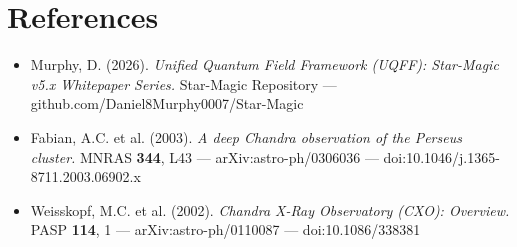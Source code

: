 \documentclass[12pt,a4paper]{article}
\begin{document}
\section*{References}
\begin{itemize}
  \item[2.] Murphy, D. (2026). \emph{Unified Quantum Field Framework (UQFF): Star-Magic v5.x Whitepaper Series.} Star-Magic Repository --- github.com/Daniel8Murphy0007/Star-Magic
  \item[4.] Fabian, A.C. et al. (2003). \emph{A deep Chandra observation of the Perseus cluster.} MNRAS \textbf{344}, L43 --- arXiv:astro-ph/0306036 --- doi:10.1046/j.1365-8711.2003.06902.x
  \item[10.] Weisskopf, M.C. et al. (2002). \emph{Chandra X-Ray Observatory (CXO): Overview.} PASP \textbf{114}, 1 --- arXiv:astro-ph/0110087 --- doi:10.1086/338381
\end{itemize}

\end{document}
